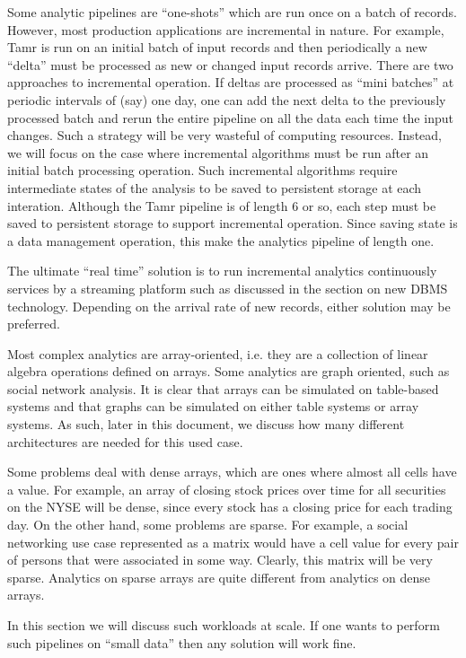 \documentclass[b5paper,11pt,twoside,openright]{book}
\begin{document}
Some analytic pipelines are ``one-shots'' which are run once on a batch
of records. However, most production applications are incremental in
nature. For example, Tamr is run on an initial batch of input records
and then periodically a new ``delta'' must be processed as new or
changed input records arrive. There are two approaches to incremental
operation. If deltas are processed as ``mini batches'' at periodic
intervals of (say) one day, one can add the next delta to the previously
processed batch and rerun the entire pipeline on all the data each time
the input changes. Such a strategy will be very wasteful of computing
resources. Instead, we will focus on the case where incremental
algorithms must be run after an initial batch processing operation. Such
incremental algorithms require intermediate states of the analysis to be
saved to persistent storage at each interation. Although the Tamr
pipeline is of length 6 or so, each step must be saved to persistent
storage to support incremental operation. Since saving state is a data
management operation, this make the analytics pipeline of length one.

The ultimate ``real time'' solution is to run incremental analytics
continuously services by a streaming platform such as discussed in the
section on new DBMS technology. Depending on the arrival rate of new
records, either solution may be preferred.

Most complex analytics are array-oriented, i.e. they are a collection of
linear algebra operations defined on arrays. Some analytics are graph
oriented, such as social network analysis. It is clear that arrays can
be simulated on table-based systems and that graphs can be simulated on
either table systems or array systems. As such, later in this document,
we discuss how many different architectures are needed for this used
case.

Some problems deal with dense arrays, which are ones where almost all
cells have a value. For example, an array of closing stock prices over
time for all securities on the NYSE will be dense, since every stock has
a closing price for each trading day. On the other hand, some problems
are sparse. For example, a social networking use case represented as a
matrix would have a cell value for every pair of persons that were
associated in some way. Clearly, this matrix will be very sparse.
Analytics on sparse arrays are quite different from analytics on dense
arrays.

In this section we will discuss such workloads at scale. If one wants to
perform such pipelines on ``small data'' then any solution will work
fine.
\end{document}
